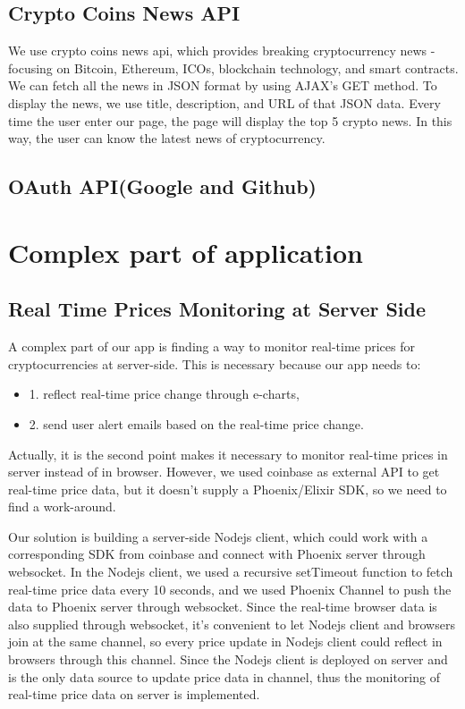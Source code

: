 \subsection{Crypto Coins News API}
We use crypto coins news api, which provides breaking cryptocurrency
news - focusing on Bitcoin, Ethereum, ICOs, blockchain technology,
and smart contracts. We can fetch all the news in JSON format by
using AJAX's GET method. To display the news, we use title, description,
and URL of that JSON data. Every time the user enter our page, the 
page will display the top 5 crypto news. In this way, the user 
can know the latest news of cryptocurrency.
\subsection{OAuth API(Google and Github)}



\section{Complex part of application}
\subsection{Real Time Prices Monitoring at Server Side}
A complex part of our app is finding a way to monitor real-time 
prices for cryptocurrencies at server-side. This is necessary 
because our app needs to: 
\begin{itemize}
\item 1. reflect real-time price change 
through e-charts, 
\item 2. send user alert emails based on the 
real-time price change. 
\end{itemize}
Actually, it is the second point 
makes it necessary to monitor real-time prices in server 
instead of in browser. However, we used coinbase as external 
API to get real-time price data, but it doesn't supply a 
Phoenix/Elixir SDK, so we need to find a work-around. 

Our solution is building a server-side Nodejs client, which 
could work with a corresponding SDK from coinbase and connect 
with Phoenix server through websocket. In the Nodejs client, 
we used a recursive setTimeout function to fetch real-time 
price data every 10 seconds, and we used Phoenix Channel to 
push the data to Phoenix server through websocket. Since the 
real-time browser data is also supplied through websocket, 
it's convenient to let Nodejs client and browsers join at 
the same channel, so every price update in Nodejs client 
could reflect in browsers through this channel. Since the 
Nodejs client is deployed on server and is the only data 
source to update price data in channel, thus the monitoring 
of real-time price data on server is implemented.

